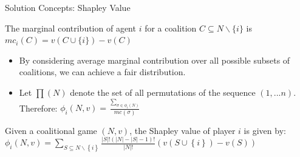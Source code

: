 \documentclass{beamer}
\begin{document}
\begin{frame}{Solution Concepts: Shapley Value}
    \begin{definition} \label{dfn:marginalcontribution}
        The {\color{blue}marginal contribution} of agent $i$ for a coalition $C \subseteq N \backslash \{i\}$ is $mc_i(C) = v(C \cup \{i\}) - v(C)$
    \end{definition}

    \begin{itemize}
        \item By considering average marginal contribution over all possible subsets of coalitions, we can achieve a fair distribution.\\
        \item Let $\prod(N)$ denote the set of all permutations of the sequence $(1,...n)$. Therefore: $\phi_i(N,v) = \frac{\sum_{\sigma \in \phi_i(N)}}{mc(\sigma)}$
    \end{itemize}

    \begin{definition} \label{dfn:shapleyvalue}
        Given a coalitional game $(N,v)$, the Shapley value of player $i$ is given by: \\
        $\phi_i(N,v) = \sum_{S \subseteq N \backslash \left\{i\right\} } \frac{|S|! (|N|-|S|-1)!}{|N|!} (v(S \cup \left\{i\right\}) - v(S))$
    \end{definition}
\end{frame}
\end{document}
